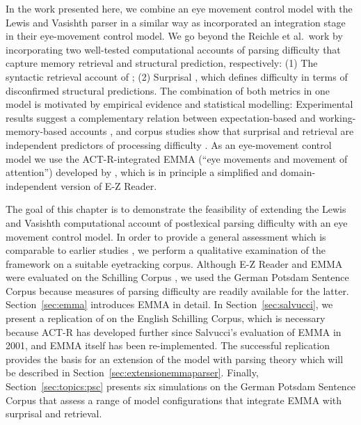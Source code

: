 \documentclass{cambridge7A}\usepackage[]{graphicx}\usepackage[]{color}
\begin{document}
In the work presented here, we combine an eye movement control model with the Lewis and Vasishth parser in a similar way as \cite{ReichleWarrenMcConnell2009} incorporated an integration stage in their eye-movement control model. We go beyond the Reichle et al.\ work by incorporating two well-tested computational accounts of parsing difficulty that capture  memory retrieval and  structural prediction, respectively: (1) The syntactic retrieval account of \cite{LewisVasishth2005}; (2) Surprisal \citep{Hale2001,Levy2008}, which defines difficulty in terms of disconfirmed structural predictions.
The combination of both metrics in one model is motivated by empirical evidence and statistical modelling: Experimental results suggest a complementary relation between expectation-based and working-memory-based accounts \citep{Demberg2008,Konieczny2000,Vasishth2011,Staub2010a}, and corpus studies show that surprisal and retrieval are independent predictors of processing difficulty \citep{jemrsurprisal,BostonHaleVasishth2011,Patil2009,VasishthLewis2006}. 
As an eye-movement control model we use the ACT-R-integrated EMMA   (``eye movements and movement of attention'') developed by \cite{Salvucci2001}, which is in principle a simplified and domain-independent version of E-Z Reader.

The goal of this chapter is to demonstrate the feasibility of extending the Lewis and Vasishth computational account of postlexical parsing difficulty with an eye movement control model.   In order to provide a general assessment which is comparable to earlier studies \citep{Reichle1998,ReichleWarrenMcConnell2009,Salvucci2001}, we perform a qualitative examination of the framework on a suitable eyetracking corpus.  Although E-Z Reader and EMMA were evaluated on the Schilling Corpus \citep{Schilling1998}, we used the German Potsdam Sentence Corpus \citep{Kliegl2004} because measures of parsing difficulty are readily available for the latter.
Section~\ref{sec:emma} introduces EMMA in detail.  In Section~\ref{sec:salvucci}, we present a replication of \cite{Salvucci2001} on the English Schilling Corpus, which is necessary because ACT-R has developed further since Salvucci's evaluation of EMMA in 2001, and EMMA itself has been re-implemented.  The successful replication provides the basis for an extension of the model with parsing theory which will be described in Section~\ref{sec:extensionemmaparser}.  Finally, Section~\ref{sec:topics:psc} presents six simulations on the German Potsdam Sentence Corpus that assess a range of model configurations that integrate EMMA with surprisal and retrieval.
\end{document}
